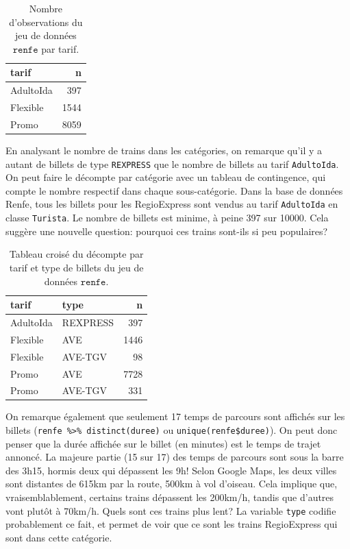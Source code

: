 \documentclass[
  11pt,
  letterpaper,
]{article}
\theoremstyle{definition}
\theoremstyle{definition}
\theoremstyle{definition}
\theoremstyle{definition}
\theoremstyle{remark}
\begin{document}
\begin{table}

\caption{\label{tab:renfe-aed1c}Nombre d'observations du jeu de données $\texttt{renfe}$ par tarif.}
\centering
\begin{tabular}[t]{lr}
\toprule
tarif & n\\
\midrule
AdultoIda & 397\\
Flexible & 1544\\
Promo & 8059\\
\bottomrule
\end{tabular}
\end{table}

En analysant le nombre de trains dans les catégories, on remarque qu'il y a autant de billets de type \texttt{REXPRESS} que le nombre de billets au tarif \texttt{AdultoIda}. On peut faire le décompte par catégorie avec un tableau de contingence, qui compte le nombre respectif dans chaque sous-catégorie. Dans la base de données Renfe, tous les billets pour les RegioExpress sont vendus au tarif \texttt{AdultoIda} en classe \texttt{Turista}. Le nombre de billets est minime, à peine 397 sur 10000. Cela suggère une nouvelle question: pourquoi ces trains sont-ils si peu populaires?

\begin{table}

\caption{\label{tab:renfe-aed2}Tableau croisé du décompte par tarif et type de billets du jeu de données $\texttt{renfe}$.}
\centering
\begin{tabular}[t]{llr}
\toprule
tarif & type & n\\
\midrule
AdultoIda & REXPRESS & 397\\
Flexible & AVE & 1446\\
Flexible & AVE-TGV & 98\\
Promo & AVE & 7728\\
Promo & AVE-TGV & 331\\
\bottomrule
\end{tabular}
\end{table}

On remarque également que seulement 17 temps de parcours sont affichés sur les billets (\texttt{renfe\ \%\textgreater{}\%\ distinct(duree)} ou \texttt{unique(renfe\$duree)}). On peut donc penser que la durée affichée sur le billet (en minutes) est le temps de trajet annoncé. La majeure partie (15 sur 17) des temps de parcours sont sous la barre des 3h15, hormis deux qui dépassent les 9h! Selon Google Maps, les deux villes sont distantes de 615km par la route, 500km à vol d'oiseau. Cela implique que, vraisemblablement, certains trains dépassent les 200km/h, tandis que d'autres vont plutôt à 70km/h. Quels sont ces trains plus lent? La variable \texttt{type} codifie probablement ce fait, et permet de voir que ce sont les trains RegioExpress qui sont dans cette catégorie.
\end{document}
